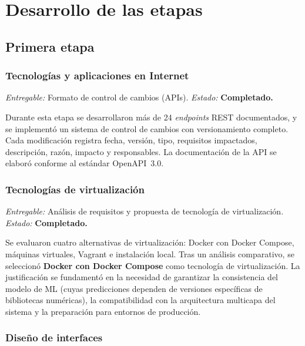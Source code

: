 \documentclass[12pt, letterpaper, twoside]{report}
\begin{document}
\section{Desarrollo de las etapas}

\subsection{Primera etapa}

\subsubsection{Tecnologías y aplicaciones en Internet}

\textit{Entregable:} Formato de control de cambios (APIs). \quad \textit{Estado:} \textbf{Completado.}

\smallskip
Durante esta etapa se desarrollaron más de 24 \textit{endpoints} REST documentados, y se implementó un sistema de control de cambios con versionamiento completo. Cada modificación registra fecha, versión, tipo, requisitos impactados, descripción, razón, impacto y responsables. La documentación de la API se elaboró conforme al estándar OpenAPI~3.0.

\subsubsection{Tecnologías de virtualización}

\textit{Entregable:} Análisis de requisitos y propuesta de tecnología de virtualización. \quad \textit{Estado:} \textbf{Completado.}

\smallskip
Se evaluaron cuatro alternativas de virtualización: Docker con Docker Compose, máquinas virtuales, Vagrant e instalación local. Tras un análisis comparativo, se seleccionó \textbf{Docker con Docker Compose} como tecnología de virtualización. La justificación se fundamentó en la necesidad de garantizar la consistencia del modelo de ML (cuyas predicciones dependen de versiones específicas de bibliotecas numéricas), la compatibilidad con la arquitectura multicapa del sistema y la preparación para entornos de producción.

\subsubsection{Diseño de interfaces}
\end{document}
